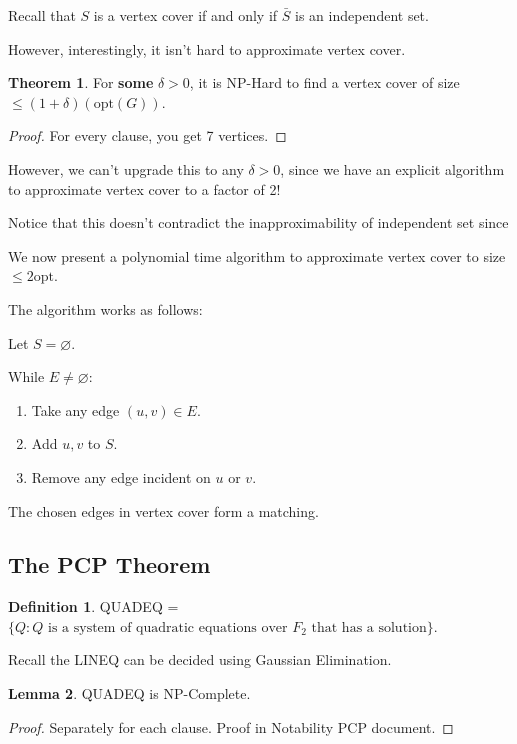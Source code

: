 \documentclass{article}
\theoremstyle{definition}
\newtheorem{definition}{Definition}
\newtheorem{theorem}{Theorem}[section]
\newtheorem{lemma}[theorem]{Lemma}
\newcommand{\opt}{\text{opt}}
\begin{document}
Recall that $S$ is a vertex cover if and only if
$\bar{S}$ is an independent set.

However, interestingly, it isn't hard to approximate
vertex cover.

\begin{theorem}
    For \textbf{some} $\delta > 0$, it is NP-Hard 
    to find a vertex cover of size $\leq (1 + \delta)(\opt(G))$.
\end{theorem}
\begin{proof}
    For every clause, you get 7 vertices.
\end{proof}

However, we can't upgrade this to any $\delta > 0$,
since we have an explicit algorithm to approximate
vertex cover to a factor of 2!


Notice that this doesn't contradict the inapproximability
of independent set since 

We now present a polynomial time algorithm to approximate vertex cover
to size $\leq 2\opt$.

The algorithm works as follows:

Let $S = \varnothing$.

While $E \neq \varnothing$:

\begin{enumerate}
    \item Take any edge $(u,v) \in E$.
    \item Add $u,v$ to $S$.
    \item Remove any edge incident on $u$ or $v$.
\end{enumerate}

The chosen edges in vertex cover form a matching.



\newpage

\subsection{The PCP Theorem}

\begin{definition}
    QUADEQ = $\{ Q: Q \text{ is a system of quadratic equations over } F_{2} \text{ that has a solution}\}$.
\end{definition}

Recall the LINEQ can be decided using Gaussian Elimination.

\begin{lemma}
    QUADEQ is NP-Complete.
\end{lemma}
\begin{proof}
    Separately for each clause. Proof in Notability PCP document.
\end{proof}
\end{document}
